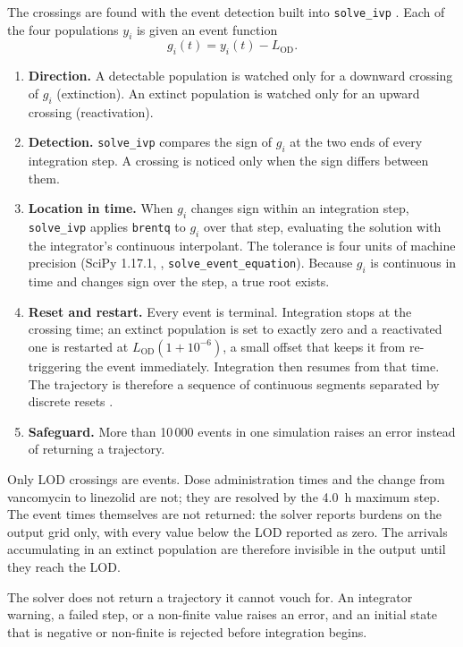 \documentclass[11pt]{article}
\newcommand{\LOD}{L_{\mathrm{OD}}}
\begin{document}
The crossings are found with the event detection built into
\texttt{solve\_ivp} \cite{2020SciPy-NMeth}. Each of the four populations $y_i$
is given an event function
\begin{equation}
g_i(t)=y_i(t)-\LOD.
\label{eq:lod-event}
\end{equation}
\begin{enumerate}
\item \textbf{Direction.} A detectable population is watched only for a
downward crossing of $g_i$ (extinction). An extinct population is watched
only for an upward crossing (reactivation).
\item \textbf{Detection.} \texttt{solve\_ivp} compares the sign of $g_i$ at
the two ends of every integration step. A crossing is noticed only when the
sign differs between them.
\item \textbf{Location in time.} When $g_i$ changes sign within an
integration step, \texttt{solve\_ivp} applies \texttt{brentq} to $g_i$ over
that step, evaluating the solution with the integrator's continuous
interpolant. The tolerance is four units of machine precision (SciPy 1.17.1,
, \texttt{solve\_event\_equation}).
Because $g_i$ is continuous in time and changes sign over the step, a true
root exists.
\item \textbf{Reset and restart.} Every event is terminal. Integration stops
at the crossing time; an extinct population is set to exactly zero and a
reactivated one is restarted at $\LOD(1+10^{-6})$, a small offset that keeps
it from re-triggering the event immediately. Integration then resumes from
that time. The trajectory is therefore a sequence of continuous segments
separated by discrete resets \cite{Enright1988,ShampineThompson2000}.
\item \textbf{Safeguard.} More than 10\,000 events in one simulation raises an
error instead of returning a trajectory.
\end{enumerate}
Only LOD crossings are events. Dose administration times and the change from
vancomycin to linezolid are not; they are resolved by the 4.0~h maximum step.
The event times themselves are not returned: the solver reports burdens on
the output grid only, with every value below the LOD reported as zero. The
arrivals accumulating in an extinct population are therefore invisible in the
output until they reach the LOD.

The solver does not return a trajectory it cannot vouch for. An integrator
warning, a failed step, or a non-finite value raises an error, and an initial
state that is negative or non-finite is rejected before integration begins.
\end{document}
